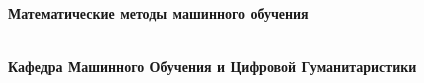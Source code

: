 \thispagestyle{empty}

\vspace{3cm}
  \begin{center}
	\bfseries \Huge Математические методы машинного обучения  \par   %
        ~\\
	\bfseries \LARGE Кафедра Машинного Обучения и Цифровой Гуманитаристики \\
    \end{center}